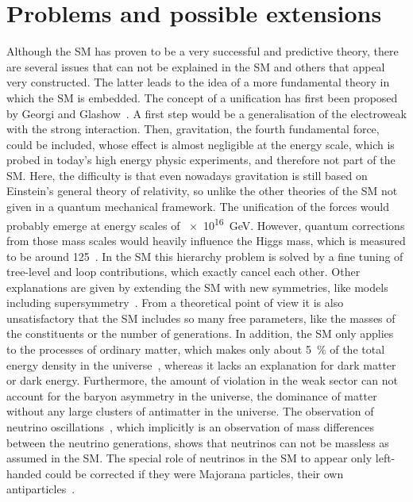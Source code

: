 
\section{Problems and possible extensions}
\label{sec:standardmodel:extensions}

Although the SM has proven to be a very successful and predictive theory,
there are several issues that can not be explained in the SM and others that
appeal very constructed. The latter leads to the idea of a more fundamental
theory in which the SM is embedded. The concept of a unification has first
been proposed by Georgi and Glashow~\cite{Georgi:1974sy}. A first step would
be a generalisation of the electroweak with the strong interaction. Then,
gravitation, the fourth fundamental force, could be included, whose effect is
almost negligible at the energy scale, which is probed in today's high energy
physic experiments, and therefore not part of the SM. Here, the difficulty is
that even nowadays gravitation is still based on Einstein's general theory of
relativity, so unlike the other theories of the SM not given in a quantum
mechanical framework. The unification of the forces would probably emerge at
energy scales of \SI{e16}{\GeV}. However, quantum corrections from those mass
scales would heavily influence the Higgs mass, which is measured to be around
\SI{125}{\GeVcc}~\cite{HiggsMass}. In the SM this hierarchy problem is
solved by a fine tuning of tree-level and loop contributions, which exactly
cancel each other. Other explanations are given by extending the SM with new
symmetries, like models including
supersymmetry~\cite{Gervais:1971ji,Golfand:1971iw,Volkov:1972jx,*Volkov:1973ix}.
From a theoretical point of view it is also unsatisfactory that the SM
includes so many free parameters, like the masses of the constituents or the
number of generations. In addition, the SM only applies to the processes of
ordinary matter, which makes only about \SI{5}{\percent} of the total energy
density in the universe~\cite{Ade:2015xua}, whereas it lacks an explanation
for dark matter or dark energy. Furthermore, the amount of \CP violation in
the weak sector can not account for the baryon asymmetry in the universe, \ie
the dominance of matter without any large clusters of antimatter in the
universe. The observation of neutrino
oscillations~\cite{Fukuda:1998mi,Ahmad:2001an,*Ahmad:2002jz}, which implicitly
is an observation of mass differences between the neutrino generations, shows
that neutrinos can not be massless as assumed in the SM. The special role of
neutrinos in the SM to appear only left-handed could be corrected if they were
Majorana particles, \ie their own antiparticles~\cite{Majorana:1937vz}.
